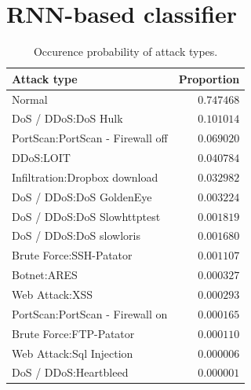 \documentclass[conference]{IEEEtran}
\begin{document}
\section{RNN-based classifier}

\begin{table}[b]
\caption{Occurence probability of attack types.} \label{tab:occurrence}
\centering
\begin{tabular}{l r} \toprule
Attack type & Proportion \\
\midrule
Normal                                                         & $0.747468$ \\
DoS / DDoS:DoS Hulk                                            & $0.101014$ \\
PortScan:PortScan - Firewall off                               & $0.069020$ \\
DDoS:LOIT                                                      & $0.040784$ \\
Infiltration:Dropbox download                                  & $0.032982$ \\
DoS / DDoS:DoS GoldenEye                                       & $0.003224$ \\
DoS / DDoS:DoS Slowhttptest                                    & $0.001819$ \\
DoS / DDoS:DoS slowloris                                       & $0.001680$ \\
Brute Force:SSH-Patator                                        & $0.001107$ \\
Botnet:ARES                                                    & $0.000327$ \\
Web Attack:XSS                                                 & $0.000293$ \\
PortScan:PortScan - Firewall on                                & $0.000165$ \\
Brute Force:FTP-Patator                                        & $0.000110$ \\
Web Attack:Sql Injection                                       & $0.000006$ \\
DoS / DDoS:Heartbleed                                          & $0.000001$ \\
\bottomrule
\end{tabular}
\label{tab:occurence}
\end{table}
\end{document}
